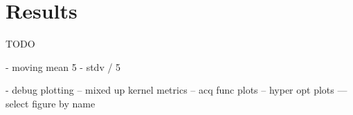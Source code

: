 \chapter{Results}
\label{chap:5}
%
TODO

- moving mean 5
- stdv / 5

- debug plotting
-- mixed up kernel metrics
-- acq func plots
-- hyper opt plots
--- select figure by name
